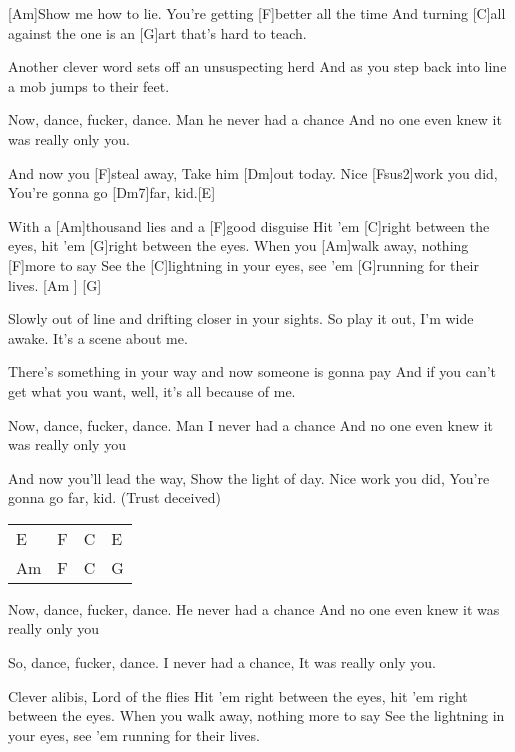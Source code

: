 

\begin{guitar}
	[Am]Show me how to lie. You're getting [F]better all the time
	And turning [C]all against the one is an [G]art that's hard to teach.
	
	Another clever word sets off an unsuspecting herd
	And as you step back into line a mob jumps to their feet.
	
	Now, dance, fucker, dance. Man he never had a chance
	And no one even knew it was really only you.
	
	And now you [F]steal away,
	Take him [Dm]out today.
	Nice [Fsus2]work you did,
	You're gonna go [Dm7]far, kid.[E]{}
	
	With a [Am]thousand lies and a [F]good disguise
	Hit 'em [C]right between the eyes, hit 'em [G]right between the eyes.
	When you [Am]walk away, nothing [F]more to say
	See the [C]lightning in your eyes, see 'em [G]running for their lives.
	[Am ] [G]{}
	
	Slowly out of line and drifting closer in your sights.
	So play it out, I'm wide awake. It's a scene about me.
	
	There's something in your way and now someone is gonna pay
	And if you can't get what you want, well, it's all because of me.
	
	Now, dance, fucker, dance. Man I never had a chance
	And no one even knew it was really only you
	
	\pagebreak
	
	And now you'll lead the way,
	Show the light of day.
	Nice work you did,
	You're gonna go far, kid. (Trust deceived)
	
	 
	
	{\footnotesize\begin{tabular}{l|l|l|l}
			E  & F & C & E \\
			Am & F & C & G
	\end{tabular}}
	
	Now, dance, fucker, dance. He never had a chance
	And no one even knew it was really only you
	
	So, dance, fucker, dance. I never had a chance,
	It was really only you.
	
	 
	
	Clever alibis, Lord of the flies
	Hit 'em right between the eyes, hit 'em right between the eyes.
	When you walk away, nothing more to say
	See the lightning in your eyes, see 'em running for their lives.
\end{guitar}